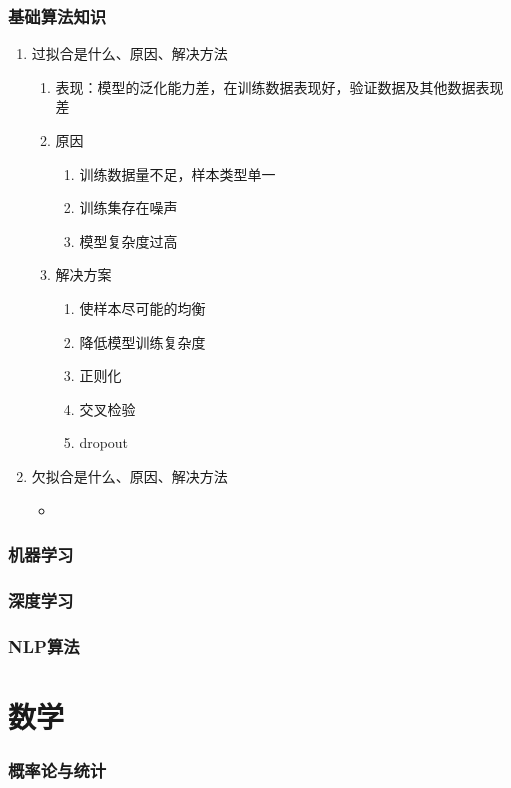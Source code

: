 \documentclass{paper}
\begin{document}
	\section{基础算法知识}
	\begin{enumerate}
		\item 过拟合是什么、原因、解决方法
		\begin{enumerate}
			\item 表现：模型的泛化能力差，在训练数据表现好，验证数据及其他数据表现差
			\item 原因
			\begin{enumerate}
				\item 训练数据量不足，样本类型单一
				\item 训练集存在噪声
				\item 模型复杂度过高
			\end{enumerate}
			\item 解决方案
			\begin{enumerate}
				\item 使样本尽可能的均衡
				\item 降低模型训练复杂度
				\item 正则化
				\item 交叉检验
				\item dropout
			\end{enumerate} 
		\end{enumerate}
		
		\item 欠拟合是什么、原因、解决方法
		\begin{itemize}
			\item 
		\end{itemize}
		
	\end{enumerate}
	\section{机器学习}
	\section{深度学习}
	\section{NLP算法}
	
	\part{数学}
	\section{概率论与统计}
\end{document}
